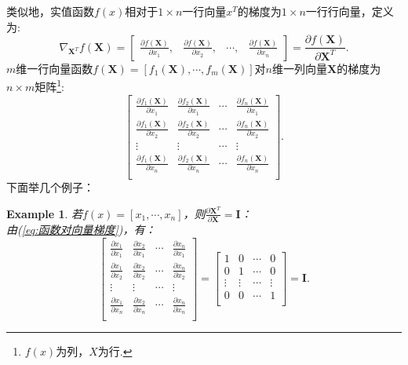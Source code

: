 \documentclass[UTF8,12pt]{ctexart}
\numberwithin{equation}{section}%
\newtheorem{example}{Example}[section]
\begin{document}
	\indent 类似地，实值函数$f(x)$相对于$1 \times n$一行向量$x^T$的梯度为$1 × n$一行行向量，定义为:
		\begin{equation}
		\nabla_{\bm{X}^T}f(\bm{X})=
		\begin{bmatrix}
		\frac{\partial f(\bm{X}) }{\partial x_1},&\frac{\partial f(\bm{X})}{\partial x_2}  ,&\cdots  ,&\frac{\partial f(\bm{X}) }{\partial x_n}
		\end{bmatrix}
		=\frac{\partial f(\bm{X})}{\partial\bm{X}^T}.
	\end{equation}
	\indent $m$维一行向量函数$f(\bm{X})=[f_1(\bm{X}),\cdots,f_m(\bm{X}) ]$对$n$维一列向量$\bm{X}$的梯度为$ n\times m$矩阵\footnote{$f(x)$为列，$X$为行.}:
		\begin{equation}\label{eq:函数对向量梯度}
		\begin{bmatrix}
			\frac{\partial f_1(\bm{X}) }{\partial x_1}	&	\frac{\partial f_2(\bm{X}) }{\partial x_1}  & \cdots &	\frac{\partial f_n(\bm{X}) }{\partial x_1} \\
			\frac{\partial f_1(\bm{X}) }{\partial x_2}	&	\frac{\partial f_2(\bm{X}) }{\partial x_2}  & \cdots &	\frac{\partial f_n(\bm{X}) }{\partial x_2} \\
			\vdots& \vdots & \cdots & \vdots\\
		\frac{\partial f_1(\bm{X}) }{\partial x_n}	&	
		\frac{\partial f_2(\bm{X}) }{\partial x_n}  & \cdots &	\frac{\partial f_n(\bm{X}) }{\partial x_n} \\
		\end{bmatrix}.
		\end{equation}
		\indent 下面举几个例子：
		\begin{example}
			若$f(x)=[x_1,\cdots,x_n]$，则$\frac{\partial \bm{X}^T }{\partial \bm{X}}=\bm{I}$：\\\indent
			由(\ref{eq:函数对向量梯度})，有：
			$$\begin{bmatrix}
				\frac{\partial x_1 }{\partial x_1}	&	\frac{\partial x_2 }{\partial x_1}  & \cdots &	\frac{\partial x_n }{\partial x_1} \\
				\frac{\partial x_1 }{\partial x_2}	&	\frac{\partial x_2}{\partial x_2}  & \cdots &	\frac{\partial x_n }{\partial x_2} \\
				\vdots& \vdots & \cdots & \vdots\\
				\frac{\partial x_1 }{\partial x_n}	&	
				\frac{\partial x_2 }{\partial x_n}  & \cdots &	\frac{\partial x_n }{\partial x_n} \\
			\end{bmatrix}=
		\begin{bmatrix}
			1	&	0  & \cdots &0 \\
			0	&	1 & \cdots & 0 \\
			\vdots& \vdots & \cdots & \vdots\\
			0	&	0  & \cdots &1 \\
		\end{bmatrix}=\bm{I}.
		$$
			
		\end{example}
		
\end{document}
